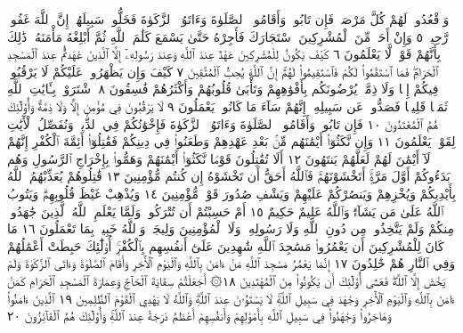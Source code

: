 وَٱقْعُدُوا۟ لَهُمْ كُلَّ مَرْصَدࣲۚ فَإِن تَابُوا۟ وَأَقَامُوا۟ ٱلصَّلَوٰةَ وَءَاتَوُا۟
ٱلزَّكَوٰةَ فَخَلُّوا۟ سَبِيلَهُمْۚ إِنَّ ٱللَّهَ غَفُورࣱ رَّحِيمࣱ ٥ وَإِنْ أَحَدࣱ
مِّنَ ٱلْمُشْرِكِينَ ٱسْتَجَارَكَ فَأَجِرْهُ حَتَّىٰ يَسْمَعَ كَلَٰمَ
ٱللَّهِ ثُمَّ أَبْلِغْهُ مَأْمَنَهُۥۚ ذَٰلِكَ بِأَنَّهُمْ قَوْمࣱ لَّا يَعْلَمُونَ ٦
كَيْفَ يَكُونُ لِلْمُشْرِكِينَ عَهْدٌ عِندَ ٱللَّهِ وَعِندَ رَسُولِهِۦٓ
إِلَّا ٱلَّذِينَ عَٰهَدتُّمْ عِندَ ٱلْمَسْجِدِ ٱلْحَرَامِۖ فَمَا ٱسْتَقَٰمُوا۟
لَكُمْ فَٱسْتَقِيمُوا۟ لَهُمْۚ إِنَّ ٱللَّهَ يُحِبُّ ٱلْمُتَّقِينَ ٧
كَيْفَ وَإِن يَظْهَرُوا۟ عَلَيْكُمْ لَا يَرْقُبُوا۟ فِيكُمْ إِلࣰّا وَلَا
ذِمَّةࣰۚ يُرْضُونَكُم بِأَفْوَٰهِهِمْ وَتَأْبَىٰ قُلُوبُهُمْ وَأَكْثَرُهُمْ
فَٰسِقُونَ ٨ ٱشْتَرَوْا۟ بِـَٔايَٰتِ ٱللَّهِ ثَمَنࣰا قَلِيلࣰا فَصَدُّوا۟ عَن
سَبِيلِهِۦٓۚ إِنَّهُمْ سَآءَ مَا كَانُوا۟ يَعْمَلُونَ ٩ لَا يَرْقُبُونَ
فِي مُؤْمِنٍ إِلࣰّا وَلَا ذِمَّةࣰۚ وَأُو۟لَٰٓئِكَ هُمُ ٱلْمُعْتَدُونَ ١٠ فَإِن
تَابُوا۟ وَأَقَامُوا۟ ٱلصَّلَوٰةَ وَءَاتَوُا۟ ٱلزَّكَوٰةَ فَإِخْوَٰنُكُمْ فِي
ٱلدِّينِۗ وَنُفَصِّلُ ٱلْأٓيَٰتِ لِقَوْمࣲ يَعْلَمُونَ ١١ وَإِن
نَّكَثُوٓا۟ أَيْمَٰنَهُم مِّنۢ بَعْدِ عَهْدِهِمْ وَطَعَنُوا۟ فِي دِينِكُمْ
فَقَٰتِلُوٓا۟ أَئِمَّةَ ٱلْكُفْرِ إِنَّهُمْ لَآ أَيْمَٰنَ لَهُمْ لَعَلَّهُمْ
يَنتَهُونَ ١٢ أَلَا تُقَٰتِلُونَ قَوْمࣰا نَّكَثُوٓا۟ أَيْمَٰنَهُمْ
وَهَمُّوا۟ بِإِخْرَاجِ ٱلرَّسُولِ وَهُم بَدَءُوكُمْ أَوَّلَ مَرَّةٍۚ
أَتَخْشَوْنَهُمْۚ فَٱللَّهُ أَحَقُّ أَن تَخْشَوْهُ إِن كُنتُم مُّؤْمِنِينَ ١٣
قَٰتِلُوهُمْ يُعَذِّبْهُمُ ٱللَّهُ بِأَيْدِيكُمْ وَيُخْزِهِمْ وَيَنصُرْكُمْ
عَلَيْهِمْ وَيَشْفِ صُدُورَ قَوْمࣲ مُّؤْمِنِينَ ١٤ وَيُذْهِبْ غَيْظَ
قُلُوبِهِمْۗ وَيَتُوبُ ٱللَّهُ عَلَىٰ مَن يَشَآءُۗ وَٱللَّهُ عَلِيمٌ حَكِيمٌ ١٥
أَمْ حَسِبْتُمْ أَن تُتْرَكُوا۟ وَلَمَّا يَعْلَمِ ٱللَّهُ ٱلَّذِينَ جَٰهَدُوا۟ مِنكُمْ
وَلَمْ يَتَّخِذُوا۟ مِن دُونِ ٱللَّهِ وَلَا رَسُولِهِۦ وَلَا ٱلْمُؤْمِنِينَ وَلِيجَةࣰۚ
وَٱللَّهُ خَبِيرُۢ بِمَا تَعْمَلُونَ ١٦ مَا كَانَ لِلْمُشْرِكِينَ أَن يَعْمُرُوا۟ مَسَٰجِدَ
ٱللَّهِ شَٰهِدِينَ عَلَىٰٓ أَنفُسِهِم بِٱلْكُفْرِۚ أُو۟لَٰٓئِكَ حَبِطَتْ
أَعْمَٰلُهُمْ وَفِي ٱلنَّارِ هُمْ خَٰلِدُونَ ١٧ إِنَّمَا يَعْمُرُ مَسَٰجِدَ
ٱللَّهِ مَنْ ءَامَنَ بِٱللَّهِ وَٱلْيَوْمِ ٱلْأٓخِرِ وَأَقَامَ ٱلصَّلَوٰةَ وَءَاتَى
ٱلزَّكَوٰةَ وَلَمْ يَخْشَ إِلَّا ٱللَّهَۖ فَعَسَىٰٓ أُو۟لَٰٓئِكَ أَن يَكُونُوا۟ مِنَ
ٱلْمُهْتَدِينَ ١٨۞ أَجَعَلْتُمْ سِقَايَةَ ٱلْحَآجِّ وَعِمَارَةَ ٱلْمَسْجِدِ
ٱلْحَرَامِ كَمَنْ ءَامَنَ بِٱللَّهِ وَٱلْيَوْمِ ٱلْأٓخِرِ وَجَٰهَدَ فِي سَبِيلِ
ٱللَّهِۚ لَا يَسْتَوُۥنَ عِندَ ٱللَّهِۗ وَٱللَّهُ لَا يَهْدِي ٱلْقَوْمَ ٱلظَّٰلِمِينَ ١٩
ٱلَّذِينَ ءَامَنُوا۟ وَهَاجَرُوا۟ وَجَٰهَدُوا۟ فِي سَبِيلِ ٱللَّهِ بِأَمْوَٰلِهِمْ
وَأَنفُسِهِمْ أَعْظَمُ دَرَجَةً عِندَ ٱللَّهِۚ وَأُو۟لَٰٓئِكَ هُمُ ٱلْفَآئِزُونَ ٢٠
